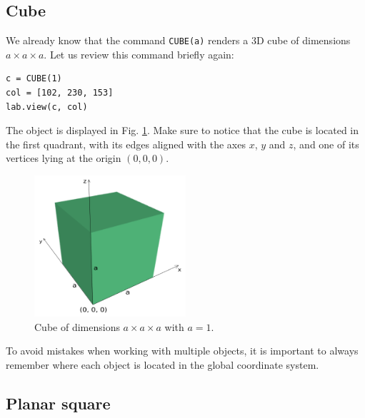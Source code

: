 \subsection{Cube}

We already know that the command {\tt CUBE(a)} renders a 3D cube of
dimensions $a \times a \times a$. Let us review this command briefly again:\\

\begin{bbox}
\begin{verbatim}
c = CUBE(1)
col = [102, 230, 153]
lab.view(c, col)
\end{verbatim}
\end{bbox}
\vspace{6mm}

\noindent
The object is displayed in Fig. \ref{fig:cube-111}. Make sure to 
notice that the cube is located in the first quadrant, with its 
edges aligned with the axes $x$, $y$ and $z$, and one of its vertices
lying at the origin $(0, 0, 0)$.

\begin{figure}[!ht]
\begin{center}
\includegraphics[width=0.5\textwidth]{img/cube-111.png}
\end{center}
\vspace{-4mm}
\caption{Cube of dimensions $a \times a \times a$ with $a = 1$.}
\label{fig:cube-111}
\end{figure}
\noindent

\begin{gbox}
To avoid mistakes when working with 
multiple objects, it is important to always remember where
each object is located in the global coordinate system.
\end{gbox}

\subsection{Planar square}

